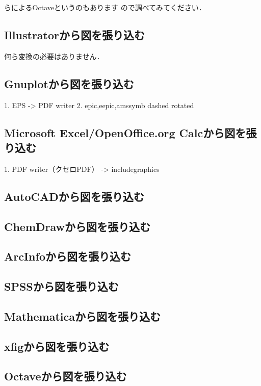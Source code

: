 らによる{Octave}というのもあります
ので調べてみてください．



\subsection{Illustratorから図を張り込む}
何ら変換の必要はありません．

\subsection{Gnuplotから図を張り込む}
1. EPS -> PDF writer
2. {epic,eepic,amssymb} dashed rotated

\subsection{Microsoft Excel/OpenOffice.org Calcから図を張り込む}
1. PDF writer（クセロPDF） -> includegraphics 

\subsection{AutoCADから図を張り込む}

\subsection{ChemDrawから図を張り込む}

\subsection{ArcInfoから図を張り込む}

\subsection{SPSSから図を張り込む}

\subsection{Mathematicaから図を張り込む}

\subsection{xfigから図を張り込む}

\subsection{Octaveから図を張り込む}

